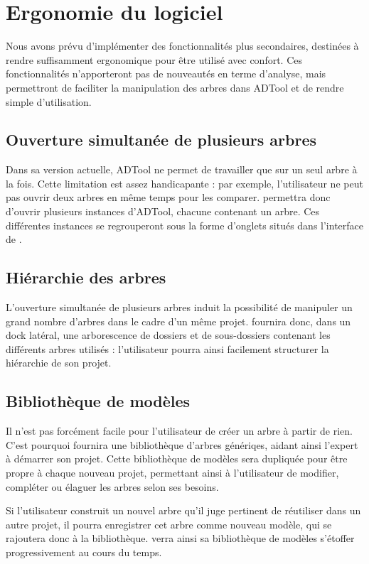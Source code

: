 \section{Ergonomie du logiciel}
	Nous avons prévu d'implémenter des fonctionnalités plus secondaires, destinées à rendre \glasir suffisamment ergonomique pour être utilisé avec confort. Ces fonctionnalités n'apporteront pas de nouveautés en terme d'analyse, mais permettront de faciliter la manipulation des arbres dans ADTool et de rendre \glasir simple d'utilisation.	

	\subsection{Ouverture simultanée de plusieurs arbres}
		Dans sa version actuelle, ADTool ne permet de travailler que sur un seul arbre à la fois. Cette limitation est assez handicapante : par exemple, l'utilisateur ne peut pas ouvrir deux arbres en même temps pour les comparer. \glasir permettra donc d'ouvrir plusieurs instances d'ADTool, chacune contenant un arbre. Ces différentes instances se regrouperont sous la forme d'onglets situés dans l'interface de \glasir.
	
	\subsection{Hiérarchie des arbres}
		L'ouverture simultanée de plusieurs arbres induit la possibilité de manipuler un grand nombre d'arbres dans le cadre d'un même projet. \glasir fournira donc, dans un dock latéral, une arborescence de dossiers et de sous-dossiers contenant les différents arbres utilisés : l'utilisateur pourra ainsi facilement structurer la hiérarchie de son projet.
	
	\subsection{Bibliothèque de modèles}
		Il n'est pas forcément facile pour l'utilisateur de créer un arbre à partir de rien. C'est pourquoi \glasir fournira une bibliothèque d'arbres génériqes, aidant ainsi l'expert à démarrer son projet. Cette bibliothèque de modèles sera dupliquée pour être propre à chaque nouveau projet, permettant ainsi à l'utilisateur de modifier, compléter ou élaguer les arbres selon ses besoins.
		
		Si l'utilisateur construit un nouvel arbre qu'il juge pertinent de réutiliser dans un autre projet, il pourra enregistrer cet arbre comme nouveau modèle, qui se rajoutera donc à la bibliothèque. \glasir verra ainsi sa bibliothèque de modèles s'étoffer progressivement au cours du temps.

